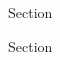 \documentclass[12pt,letterpaper]{article}
\begin{document}
                  \hypertarget{7.5}{}
\begin{secbox}{Section}{

}\end{secbox}
                  \hypertarget{7.6}{}
\begin{secbox}{Section}{

}\end{secbox}
\end{document}
